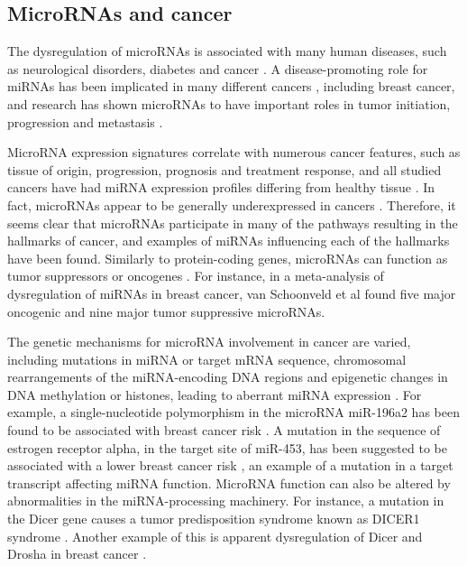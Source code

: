 \subsection{MicroRNAs and cancer}

The dysregulation of microRNAs is associated with many human diseases, such as
neurological disorders, diabetes and cancer \citep{Jiang2009}. A
disease-promoting role for miRNAs has been implicated in many different
cancers \citep{Melo2011}, including breast cancer, and research has shown microRNAs
to have important roles in tumor initiation,
progression and metastasis \citep{Lin2015}.

MicroRNA expression signatures
correlate with numerous cancer features, such as tissue of origin, 
progression, prognosis and treatment response, and all studied cancers
have had miRNA expression profiles differing from healthy tissue
\citep{Calin2006}. In fact, microRNAs appear to be generally underexpressed in
cancers \citep{Lu2005}. Therefore, it seems clear that microRNAs participate
in many of the pathways resulting in the hallmarks of cancer, and
examples of miRNAs influencing each of the hallmarks have been found.
Similarly to protein-coding genes, microRNAs can function as tumor
suppressors or oncogenes \citep{Lin2015}. For instance, in a
meta-analysis of dysregulation of miRNAs in breast cancer, van Schoonveld
et al \citep{vanSchooneveld2015} found five major oncogenic and nine major tumor suppressive microRNAs.


The genetic mechanisms for microRNA involvement in cancer are varied,
including mutations in miRNA or target mRNA sequence, chromosomal
rearrangements of the miRNA-encoding DNA regions and epigenetic changes in DNA
methylation or histones, leading to aberrant miRNA expression
\citep{Calin2006,Melo2011}. For example, a single-nucleotide polymorphism
in the microRNA miR-196a2 has been found to be associated with breast cancer
risk \citep{Gao2011}. A mutation in the sequence of estrogen receptor alpha,
in the target site of miR-453, has been suggested to be associated with a
lower breast cancer risk \citep{Tchatchou2009}, an example of a mutation in
a target transcript affecting miRNA function. MicroRNA function can also be
altered by abnormalities in the miRNA-processing machinery. For instance, a
mutation in the Dicer gene causes a tumor predisposition syndrome known as
DICER1 syndrome \citep{Slade2011}. Another example of this is apparent
dysregulation of Dicer and Drosha in breast cancer \citep{Yan2012}.

